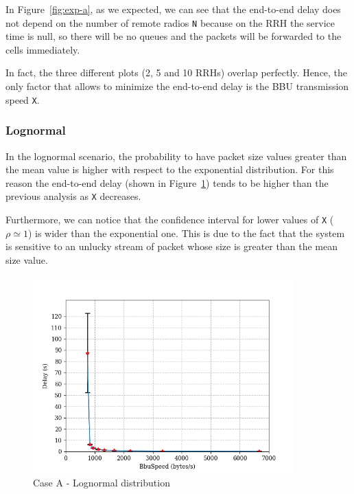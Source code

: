 \documentclass[11pt,a4paper,oneside, openright]{article}
\begin{document}
In Figure~\ref{fig:exp-a}, as we expected, we can see that the end-to-end delay does not depend on the number of remote radios \texttt{N} because on the RRH the service time is null, so there will be no queues and the packets will be forwarded to the cells immediately.

In fact, the three different plots (2, 5 and 10 RRHs) overlap perfectly.
Hence, the only factor that allows to minimize the end-to-end delay is the BBU transmission speed \texttt{X}.


\subsubsection{Lognormal}
In the lognormal scenario, the probability to have packet size values greater than the mean value is higher with respect to the exponential distribution. For this reason the end-to-end delay (shown in Figure~\ref{fig:log-a}) tends to be higher than the previous analysis as \texttt{X} decreases.

Furthermore, we can notice that the confidence interval for lower values of \texttt{X} ($\rho \simeq 1$) is wider than the exponential one. This is due to the fact that the system is sensitive to an unlucky stream of packet whose size is greater than the mean size value.

\begin{figure}[h]
	\centering
	\includegraphics[width=0.9\textwidth]{images/case-a-logn}
	\caption{Case A - Lognormal distribution}
	\label{fig:log-a}
\end{figure}
\end{document}
